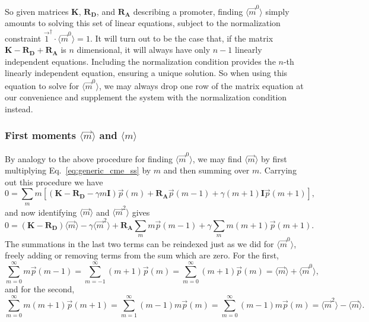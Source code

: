 So given matrices $\mathbf{K}$, $\mathbf{R_D}$, and $\mathbf{R_A}$ describing a
promoter, finding $\langle\vec{m}^0\rangle$ simply amounts to solving this set
of linear equations, subject to the normalization constraint $\vec{1}^\dagger
\cdot \langle\vec{m}^0\rangle = 1$. It will turn out to be the case that, if the
matrix $\mathbf{K} - \mathbf{R_D} + \mathbf{R_A}$ is $n$ dimensional, it will
always have only $n-1$ linearly independent equations. Including the
normalization condition provides the $n$-th linearly independent equation,
ensuring a unique solution. So when using this equation to solve for
$\langle\vec{m}^0\rangle$, we may always drop one row of the matrix equation at
our convenience and supplement the system with the normalization condition
instead.

\subsubsection{First moments $\langle\vec{m}\rangle$ and $\langle{m}\rangle$}
By analogy to the above procedure for finding $\langle\vec{m}^0\rangle$, we may
find $\langle\vec{m}\rangle$ by first multiplying Eq.~\ref{eq:generic_cme_ss} by
$m$ and then summing over $m$. Carrying out this procedure we have
\begin{equation}
0 = \sum_m m \left[
\left( \mathbf{K} - \mathbf{R_D} - \gamma m \mathbf{I} \right) \vec{p}(m)
            + \mathbf{R_A} \vec{p}(m-1) +
            \gamma (m+1) \mathbf{I} \vec{p}(m+1)
\right],
\end{equation}
and now identifying $\langle\vec{m}\rangle$ and $\langle\vec{m}^2\rangle$ gives
\begin{equation}
0 = (\mathbf{K} - \mathbf{R_D}) \langle\vec{m}\rangle
    - \gamma \langle\vec{m}^2\rangle + \mathbf{R_A} \sum_m m\vec{p}(m-1)
    + \gamma \sum_m m(m+1)\vec{p}(m+1).
\label{eq:generic_cme_deriv_030}
\end{equation}
The summations in the last two terms can be reindexed just as we did for
$\langle\vec{m}^0\rangle$, freely adding or removing terms from the sum which
are zero. For the first,
\begin{equation}
\sum_{m=0}^\infty m\vec{p}(m-1)
= \sum_{m=-1}^\infty (m+1)\vec{p}(m)
= \sum_{m=0}^\infty (m+1)\vec{p}(m)
= \langle\vec{m}\rangle + \langle\vec{m}^0\rangle,
\end{equation}
and for the second,
\begin{equation}
\sum_{m=0}^\infty m(m+1)\vec{p}(m+1)
= \sum_{m=1}^\infty (m-1)m\vec{p}(m)
= \sum_{m=0}^\infty (m-1) m\vec{p}(m)
= \langle\vec{m}^2\rangle - \langle\vec{m}\rangle.
\end{equation}
